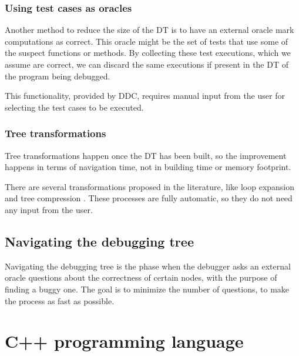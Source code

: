 \subsubsection{Using test cases as oracles}

Another method to reduce the size of the DT is to have an external oracle mark computations as correct.
This oracle might be the set of tests that use some of the suspect functions or methods. By collecting these test executions, which we assume are correct, we can discard the same executions if present in the DT of the program being debugged.

This functionality, provided by DDC, requires manual input from the user for selecting the test cases to be executed.


\subsubsection{Tree transformations}
Tree transformations happen once the DT has been built, so the improvement happens in terms of navigation time, not in building time or memory footprint.

There are several transformations proposed in the literature, like loop expansion and tree compression \cite{LoopExpansionTreeCompression}.
These processes are fully automatic, so they do not need any input from the user.

\subsection{Navigating the debugging tree}
Navigating the debugging tree is the phase when the debugger asks an external oracle questions about the correctness of certain nodes, with the purpose of finding a buggy one.
The goal is to minimize the number of questions, to make the process as fast as possible.


\section{C++ programming language}

